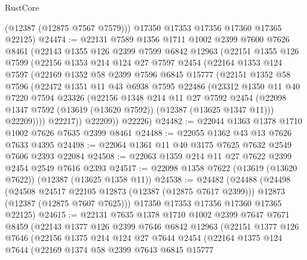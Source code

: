\begin{lexlean}{RustCore}
\begin{coremodule}
        (@12387 (@12875 @7567 @7579)))
      @17350
      @17353
      @17356
      @17360
      @17365
      @22125)
@24474 := @22131
    @7589
    @1356
    @1711
    @1002
    @2399
    @7600
    @7626
    @8461
    (@22143
      @1355
      @126
      @2399
      @7599
      @6842
      @12963
      (@22151
        @1355
        @126
        @7599
        (@22156
          @1353
          @214
          @124
          @27
          @7597
          @2454
          (@22164
            @1353
            @124
            @7597
            (@22169
              @1352
              @58
              @2399
              @7596
              @6845
              @15777
              (@22151
                @1352
                @58
                @7596
                (@22472
                  @1351
                  @11
                  @43
                  @6938
                  @7595
                  @22486
                  (@23312
                    @1350
                    @11
                    @40
                    @7220
                    @7594
                    @23326
                    (@22156
                      @1348
                      @214
                      @11
                      @27
                      @7592
                      @2454
                      (@22098 @1347 @7592 (@13619 (@13620 @7592)) (@12387 (@13625 @1347 @11)))
                      @22209))))
              @22217))
          @22209))
      @22226)
@24482 := @22044 @1363 @1378 @1710 @1002 @7626 @7635 @2399 @8461
@24488 := @22055 @1362 @43 @13 @7626 @7633 @4395
@24498 := @22064 @1361 @11 @40 @3175 @7625 @7632 @2549 @7606 @2393 @22084
@24508 := @22063 @1359 @214 @11 @27 @7622 @2399 @2454 @2549 @7616 @2393
@24517 := @22098 @1358 @7622 (@13619 (@13620 @7622)) (@12387 (@13625 @1358 @11))
@24538 := @24482
    (@24488
      (@24498
        (@24508 @24517 @22105 @12873 (@12387 (@12875 @7617 @2399)))
        @12873
        (@12387 (@12875 @7607 @7625)))
      @17350
      @17353
      @17356
      @17360
      @17365
      @22125)
@24615 := @22131
    @7635
    @1378
    @1710
    @1002
    @2399
    @7647
    @7671
    @8459
    (@22143
      @1377
      @126
      @2399
      @7646
      @6842
      @12963
      (@22151
        @1377
        @126
        @7646
        (@22156
          @1375
          @214
          @124
          @27
          @7644
          @2454
          (@22164
            @1375
            @124
            @7644
            (@22169
              @1374
              @58
              @2399
              @7643
              @6845
              @15777

\end{coremodule}
\end{lexlean}
